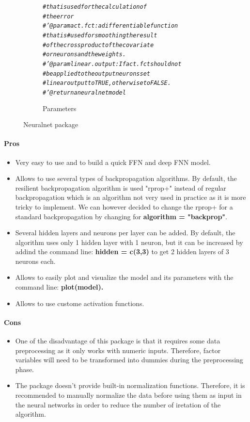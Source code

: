 \documentclass[letter,8pt]{article}\usepackage[]{graphicx}\usepackage[]{color}
\makeatletter
\newcommand{\hlcom}[1]{\textcolor[rgb]{0.678,0.584,0.686}{\textit{#1}}}%
\newenvironment{kframe}{%
 \def\at@end@of@kframe{}%
 \ifinner\ifhmode%
  \def\at@end@of@kframe{\end{minipage}}%
  \begin{minipage}{\columnwidth}%
 \fi\fi%
 \def\FrameCommand##1{\hskip\@totalleftmargin \hskip-\fboxsep
 \colorbox{shadecolor}{##1}\hskip-\fboxsep
     \hskip-\linewidth \hskip-\@totalleftmargin \hskip\columnwidth}%
 \MakeFramed {\advance\hsize-\width
   \@totalleftmargin\z@ \linewidth\hsize
   \@setminipage}}%
 {\par\unskip\endMakeFramed%
 \at@end@of@kframe}
\newenvironment{knitrout}{}{} %
\makeatother
\begin{document}
\begin{figure}[H]
\begin{subfigure}{0.5\textwidth}
\begin{knitrout}
\begin{kframe}
\begin{alltt}
\hlcom{#         that is used for the calculation of }
\hlcom{#         the error}
\hlcom{#' @param act.fct : a differentiable function }
\hlcom{#         that is #used for smoothing the result }
\hlcom{#         of the cross product of the covariate }
\hlcom{#         or neurons and the weights.}
\hlcom{#' @param linear.output :  If act.fct should not}
\hlcom{#         be applied to the output neurons set }
\hlcom{#         linear output to TRUE, otherwise to FALSE.}
\hlcom{#' @return a neuralnet model}
\end{alltt}
\end{kframe}
\end{knitrout}
    \caption{Parameters}
  \end{subfigure}
    \caption{Neuralnet package}
\end{figure}


\paragraph{Pros}
\begin{itemize}
\item Very easy to use and to build a quick FFN and deep FNN model.
\item Allows to use several types of backpropagation algorithms. By default, the resilient backpropagation algorithm is used "rprop+" instead of regular backpropagation which is an algorithm not very used in practice as it is more tricky to implement. We can however decided to change the rprop+ for a standard backpropagation by changing for \textbf{algorithm = "backprop"}.
\item Several hidden layers and neurons per layer can be added. By default, the algorithm uses only 1 hidden layer with 1 neuron, but it can be increased by addind the command line: \textbf{hidden = c(3,3)} to get 2 hidden layers of 3 neurons each.
\item Allows to easily plot and visualize the model and its parameters with the command line: \textbf{plot(model).}
\item Allows to use custome activation functions.
\end{itemize}
\paragraph{Cons}
\begin{itemize}
\item One of the disadvantage of this package is that it requires some data preprocessing as it only works with numeric inputs. Therefore, factor variables will need to be transformed into dummies during the preprocessing phase. 
\item The package doesn't provide built-in normalization functions. Therefore, it is recommended to manually normalize the data before using them as input in the neural networks in order to reduce the number of iretation of the algorithm.
\end{itemize}
\end{document}
